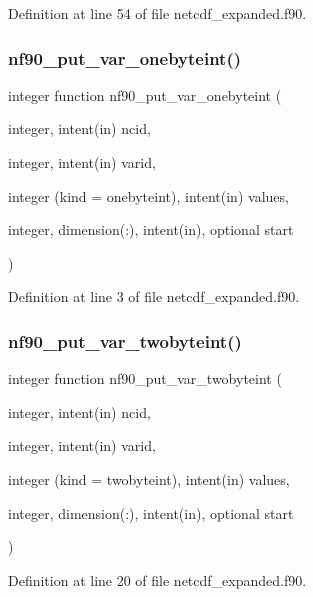 Definition at line 54 of file netcdf\+\_\+expanded.\+f90.

\mbox{\label{netcdf__expanded_8f90_a0d03b7b88dcd719c503027ccebdd3920}} 
\subsubsection{\texorpdfstring{nf90\+\_\+put\+\_\+var\+\_\+onebyteint()}{nf90\_put\_var\_onebyteint()}}
{\footnotesize\ttfamily integer function nf90\+\_\+put\+\_\+var\+\_\+onebyteint (\begin{DoxyParamCaption}\item[{integer, intent(in)}]{ncid,  }\item[{integer, intent(in)}]{varid,  }\item[{integer (kind = onebyteint), intent(in)}]{values,  }\item[{integer, dimension(\+:), intent(in), optional}]{start }\end{DoxyParamCaption})}



Definition at line 3 of file netcdf\+\_\+expanded.\+f90.

\mbox{\label{netcdf__expanded_8f90_acff6575674141c88292d791bb798dbb8}} 
\subsubsection{\texorpdfstring{nf90\+\_\+put\+\_\+var\+\_\+twobyteint()}{nf90\_put\_var\_twobyteint()}}
{\footnotesize\ttfamily integer function nf90\+\_\+put\+\_\+var\+\_\+twobyteint (\begin{DoxyParamCaption}\item[{integer, intent(in)}]{ncid,  }\item[{integer, intent(in)}]{varid,  }\item[{integer (kind = twobyteint), intent(in)}]{values,  }\item[{integer, dimension(\+:), intent(in), optional}]{start }\end{DoxyParamCaption})}



Definition at line 20 of file netcdf\+\_\+expanded.\+f90.

